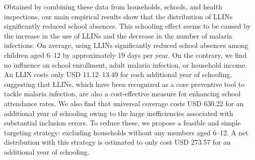 \documentclass[fleqn,11pt]{article}
\begin{document}
Obtained by combining these data from households, schools, and health inspections, our main empirical results show that the distribution of LLINs significantly reduced school absences. This schooling effect seems to be caused by the increase in the use of LLINs and the decrease in the number of malaria infections. On average, using LLINs significantly reduced school absences among children aged 6--12 by approximately 19 days per year. On the contrary, we find no influence on school enrollment, adult malaria infection, or household income. An LLIN costs only USD 11.12--13.49 for each additional year of schooling, suggesting that LLINs, which have been recognized as a core preventive tool to tackle malaria infection, are also a cost-effective measure for enhancing school attendance rates. We also find that universal coverage costs USD 630.22 for an additional year of schooling owing to the large inefficiencies associated with substantial inclusion errors. To reduce these, we propose a feasible and simple targeting strategy: excluding households without any members aged 6--12. A net distribution with this strategy is estimated to only cost USD 273.57 for an additional year of schooling. 



\end{document}
